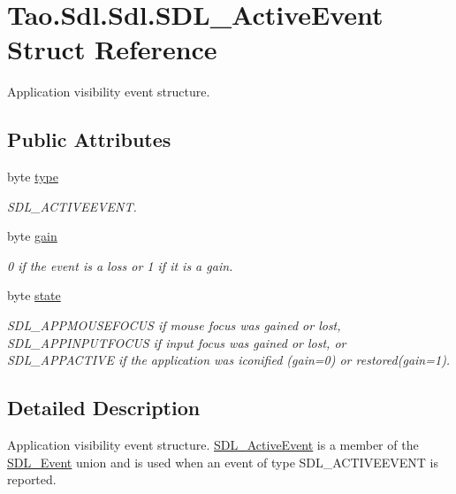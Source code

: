 \hypertarget{struct_tao_1_1_sdl_1_1_sdl_1_1_s_d_l___active_event}{
\section{Tao.Sdl.Sdl.SDL\_\-ActiveEvent Struct Reference}
\label{struct_tao_1_1_sdl_1_1_sdl_1_1_s_d_l___active_event}
}


Application visibility event structure.  


\subsection*{Public Attributes}
\begin{DoxyCompactItemize}
\item 
byte \hyperlink{struct_tao_1_1_sdl_1_1_sdl_1_1_s_d_l___active_event_a3ccdb2d70afdc19618061c6d5b28356a}{type}
\begin{DoxyCompactList}\small\item\em SDL\_\-ACTIVEEVENT. \item\end{DoxyCompactList}\item 
byte \hyperlink{struct_tao_1_1_sdl_1_1_sdl_1_1_s_d_l___active_event_a3bcc9961225a5da23402981050d980b7}{gain}
\begin{DoxyCompactList}\small\item\em 0 if the event is a loss or 1 if it is a gain. \item\end{DoxyCompactList}\item 
byte \hyperlink{struct_tao_1_1_sdl_1_1_sdl_1_1_s_d_l___active_event_a7f667864c62204bef0a17717adf15600}{state}
\begin{DoxyCompactList}\small\item\em SDL\_\-APPMOUSEFOCUS if mouse focus was gained or lost, SDL\_\-APPINPUTFOCUS if input focus was gained or lost, or SDL\_\-APPACTIVE if the application was iconified (gain=0) or restored(gain=1). \item\end{DoxyCompactList}\end{DoxyCompactItemize}


\subsection{Detailed Description}
Application visibility event structure. \hyperlink{struct_tao_1_1_sdl_1_1_sdl_1_1_s_d_l___active_event}{SDL\_\-ActiveEvent} is a member of the \hyperlink{struct_tao_1_1_sdl_1_1_s_d_l___event}{SDL\_\-Event} union and is used when an event of type SDL\_\-ACTIVEEVENT is reported. 

